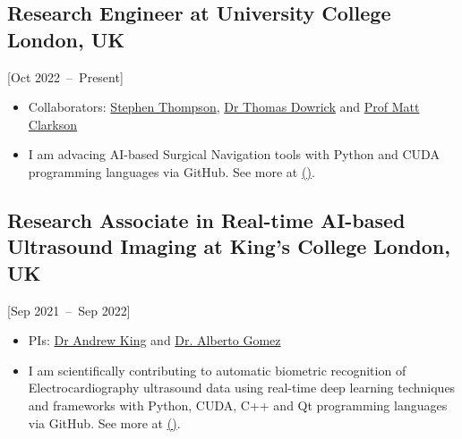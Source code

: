 \documentclass{mycv}
\begin{document}
\subsection{Research Engineer at University College London, UK}[Oct 2022~--~Present]
\begin{itemize}
  \item Collaborators: \href{https://scholar.google.co.uk/citations?user=-rD4cJIAAAAJ}{Stephen Thompson},  \href{https://iris.ucl.ac.uk/iris/browse/profile?upi=TMDOW59}{Dr Thomas Dowrick} and \href{https://iris.ucl.ac.uk/iris/browse/profile?upi=MJCLA42}{Prof Matt Clarkson}
  \item 
I am advacing AI-based Surgical Navigation tools with Python and CUDA programming languages via GitHub.
See more at \href{https://github.com/SciKit-Surgery}{(\faExternalLink*)}.
\end{itemize}


\subsection{Research Associate in Real-time AI-based Ultrasound Imaging at King's College London, UK}[Sep 2021~--~Sep 2022]
\begin{itemize}
  \item PIs: \href{http://kclmmag.org/}{Dr Andrew King} and  \href{https://gomezalberto.github.io/}{Dr. Alberto Gomez}
  \item 
I am scientifically contributing to automatic biometric recognition of Electrocardiography ultrasound data using real-time deep learning techniques and frameworks with Python, CUDA, C++ and Qt programming languages via GitHub.
See more at \href{http://vital.oucru.org/major-partners/kings-college-london/}{(\faExternalLink*)}.
\end{itemize}
\end{document}
